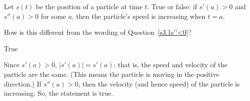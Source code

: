 \begin{question}\label{s3.1s''<02}
Let $s(t)$ be the position of a particle at time $t$. True or false: if $s'(a)>0$ and $s''(a)>0$ for some $a$, then the particle's speed is increasing when $t=a$.
\end{question}
\begin{hint}
How is this different from the wording of Question~\ref{s3.1s''<0}?
\end{hint}
\begin{answer}
True
\end{answer}
\begin{solution}
Since $s'(a)>0$, $|s'(a)|=s'(a)$: that is, the speed and velocity of the particle are the same. (This means the particle is moving in the positive direction.)
If $s''(a)>0$, then the velocity (and hence speed) of the particle is increasing. So, the statement is true.
\end{solution}



\subsection*{\Procedural}



